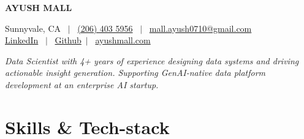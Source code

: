 \documentclass[10pt,a4paper]{article}
\begin{document}

\noindent
\begin{minipage}[c]{0.45\textwidth}
    \vspace{0pt}
    {\LARGE \textbf{AYUSH MALL}}
\end{minipage}%
\begin{minipage}[c]{0.55\textwidth}
    \raggedleft
    Sunnyvale, CA \ $|$ \ \href{tel:12064035956}{(206) 403 5956} \ $|$ \
    \href{mailto:mall.ayush0710@gmail.com?subject=Resume\%20Enquiry}{mall.ayush0710@gmail.com} \\
    \href{https://www.linkedin.com/in/ayush-mall}{LinkedIn} \ $|$ \
    \href{https://github.com/ayushmall0710}{Github}\ $|$ \
    \href{https://ayushmall.com}{ayushmall.com} \\
\end{minipage}

\vspace{0.2em}


\noindent\textit{Data Scientist with 4+ years of experience designing data systems and driving actionable insight generation. Supporting GenAI-native data platform development at an enterprise AI startup.}



\section*{Skills \& Tech-stack}

\end{document}
